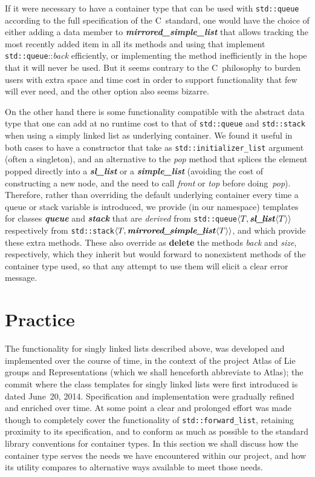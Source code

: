 \documentclass[12pt]{article}
\theoremstyle{plain}
\theoremstyle{definition}
\def\PP{\copy\PPbox}
\newcommand\Cee{\textsc{C}}
\newcommand\Cpp{\Cee\PP}
\newcommand\std[1]{\texttt{std::#1}}
\def\frwl.{\std{forward\_list}}
\def\slls.{\textbf{\textit{sl\_\!list}}}
\def\smpl.{\textbf{\textit{simple\_\!list}}}
\def\mspl.{\textbf{\textit{mirrored\_\!simple\_\!list}}}
\def\queue.{\textbf{\textit{queue}}}
\def\stack.{\textbf{\textit{stack}}}
\def\ang#1{\langle#1\rangle}
\begin{document}
If it were necessary to have a container type that can be used with \std{queue}
according to the full specification of the \Cpp\ standard, one would have the
choice of either adding a data member to \mspl. that allows tracking the most
recently added item in all its methods and using that implement
\std{queue}::\textit{back} efficiently, or implementing the method inefficiently
in the hope that it will never be used. But it seems contrary to the
\Cpp\ philosophy to burden users with extra space and time cost in order to
support functionality that few will ever need, and the other option also seems
bizarre.

On the other hand there is some functionality compatible with the abstract data
type that one can add at no runtime cost to that of \std{queue} and \std{stack}
when using a simply linked list as underlying container. We found it useful in
both cases to have a constructor that take as \std{initializer\_list} argument
(often a singleton), and an alternative to the \textit{pop} method that splices
the element popped directly into a \slls. or a \smpl. (avoiding the cost of
constructing a new node, and the need to call \textit{front} or \textit{top}
before doing~\textit{pop}). Therefore, rather than overriding the default
underlying container every time a queue or stack variable is introduced, we
provide (in our namespace) templates for classes \queue. and \stack. that are
\emph{derived} from \std{queue}$\ang{T,\slls.\ang{T}}$ respectively from
\std{stack}$\ang{T,\mspl.\ang{T}}$, and which provide these extra methods. These
also override as \textbf{delete} the methods \textit{back} and \textit{size},
respectively, which they inherit but would forward to nonexistent methods of the
container type used, so that any attempt to use them will elicit a clear error
message.

\section{Practice}

The functionality for singly linked lists described above, was developed and
implemented over the course of time, in the context of the project Atlas of Lie
groups and Representations (which we shall henceforth abbreviate to Atlas); the
commit where the class templates for singly linked lists were first introduced
is dated June~20, 2014. Specification and implementation were gradually refined
and enriched over time. At some point a clear and prolonged effort was made
though to completely cover the functionality of \frwl., retaining proximity to
its specification, and to conform as much as possible to the standard library
conventions for container types. In this section we shall discuss how the
container type serves the needs we have encountered within our project, and
how its utility compares to alternative ways available to meet those needs.
\end{document}
